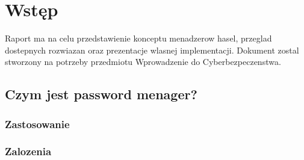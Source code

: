 \section{Wstęp}
Raport ma na celu przedstawienie konceptu menadzerow hasel, przeglad dostepnych rozwiazan oraz prezentacje wlasnej implementacji. Dokument zostal stworzony na potrzeby przedmiotu Wprowadzenie do Cyberbezpeczenstwa. 

\subsection{Czym jest password menager?}
\subsubsection{Zastosowanie}

\subsubsection{Zalozenia}


